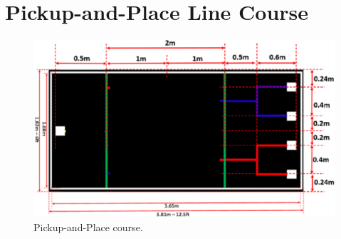 \documentclass[12pt]{report}
\begin{document}
\newpage\section{Pickup-and-Place Line Course}
\begin{figure}[H]
    \centering
    \includegraphics[width = 1.1\textwidth,angle = 270,keepaspectratio]{Images/Diagrams/pickup_place_course.pdf}
    \caption{Pickup-and-Place course.\protect\footnotemark}
    \label{fig:pickup-place-course}
\end{figure}
\end{document}
